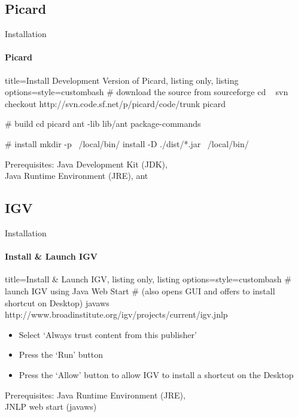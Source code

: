 \documentclass{beamer}
\begin{document}
\subsection*{Picard}
\begin{frame}[fragile]{Installation}
\framesubtitle{Picard}
\begin{tcblisting}{title={Install Development Version of Picard}, listing only, listing options={style=custombash}}
# download the source from sourceforge
cd ~
svn checkout http://svn.code.sf.net/p/picard/code/trunk picard

# build
cd picard
ant -lib lib/ant package-commands

# install
mkdir -p ~/local/bin/
install -D ./dist/*.jar ~/local/bin/
\end{tcblisting}

Prerequisites: 
Java Development Kit (JDK), \\
Java Runtime Environment (JRE), 
ant

\end{frame}


\subsection*{IGV}
\begin{frame}[fragile]{Installation}
\framesubtitle{Install \& Launch IGV}
\begin{tcblisting}{title={Install \& Launch IGV}, listing only, listing options={style=custombash}}
# launch IGV using Java Web Start 
# (also opens GUI and offers to install shortcut on Desktop)
javaws http://www.broadinstitute.org/igv/projects/current/igv.jnlp
\end{tcblisting}
\begin{itemize}
\item Select `Always trust content from this publisher'
\item Press the `Run' button
\item Press the `Allow' button to allow IGV to install a shortcut on the Desktop
\end{itemize}
Prerequisites:
Java Runtime Environment (JRE), \\
JNLP web start (javaws)
\end{frame}




\end{document}
